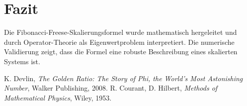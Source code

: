 \documentclass[a4paper,12pt]{article}
\begin{document}
\section{Fazit}
Die Fibonacci-Freese-Skalierungsformel wurde mathematisch hergeleitet und durch Operator-Theorie als Eigenwertproblem interpretiert. Die numerische Validierung zeigt, dass die Formel eine robuste Beschreibung eines skalierten Systems ist.

\begin{thebibliography}{9}
 K. Devlin, \textit{The Golden Ratio: The Story of Phi, the World's Most Astonishing Number}, Walker Publishing, 2008.
 R. Courant, D. Hilbert, \textit{Methods of Mathematical Physics}, Wiley, 1953.
\end{thebibliography}
\end{document}
